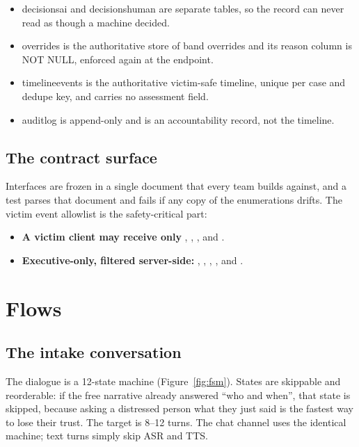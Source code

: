 \documentclass[11pt,a4paper]{article}
\newcommand{\codeus}{\textunderscore\allowbreak}
\DeclareRobustCommand{\code}[1]{{\ttfamily\let\_\codeus #1}}
\begin{document}
\begin{itemize}
  \item \code{decisions\_ai} and \code{decisions\_human} are separate tables, so the record can never
        read as though a machine decided.
  \item \code{overrides} is the authoritative store of band overrides and its \code{reason} column is
        \code{NOT NULL}, enforced again at the endpoint.
  \item \code{timeline\_events} is the authoritative victim-safe timeline, unique per case and dedupe
        key, and carries no assessment field.
  \item \code{audit\_log} is append-only and is an accountability record, not the timeline.
\end{itemize}

\subsection{The contract surface}
Interfaces are frozen in a single document that every team builds against, and a test parses that
document and fails if any copy of the enumerations drifts. The victim event allowlist is the
safety-critical part:
\begingroup\raggedright
\begin{itemize}[itemsep=1pt]
  \item \textbf{A victim client may receive only} ,
        , ,  and
        .
  \item \textbf{Executive-only, filtered server-side:} ,
        , ,
        ,  and
        .
\end{itemize}
\endgroup
\section{Flows}
\label{sec:flows}

\subsection{The intake conversation}
The dialogue is a 12-state machine (Figure~\ref{fig:fsm}). States are skippable and reorderable: if
the free narrative already answered ``who and when'', that state is skipped, because asking a
distressed person what they just said is the fastest way to lose their trust. The target is 8--12
turns. The chat channel uses the identical machine; text turns simply skip ASR and TTS.
\end{document}
